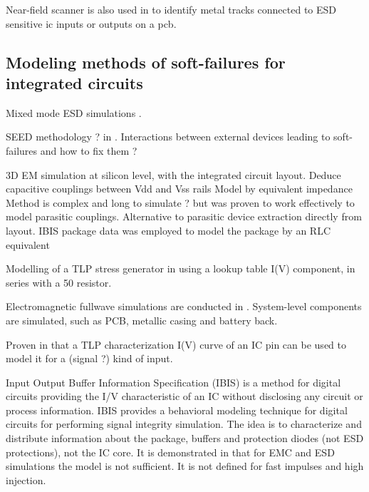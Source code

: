%
Near-field scanner is also used in \cite{NearFieldInjectionBis} to identify metal tracks connected to ESD sensitive \gls{ic} inputs or outputs on a \gls{pcb}.


\subsection{Modeling methods of soft-failures for integrated circuits}

%
Mixed mode ESD simulations \cite{mixedModeESDSims}.

%
SEED methodology ? in \cite{usb2ESDProtection}.
Interactions between external devices leading to soft-failures and how to fix them ?

3D EM simulation \cite{LacrampeTransientImmunity} at silicon level, with the integrated circuit layout.
Deduce capacitive couplings between Vdd and Vss rails
Model by equivalent impedance
Method is complex and long to simulate ? but was proven to work effectively to model parasitic couplings.
Alternative to parasitic device extraction directly from layout.
IBIS package data was employed to model the package by an RLC equivalent

%
Modelling of a TLP stress generator in \cite{LacrampeTransientImmunity} using a lookup table I(V) component, in series with a 50\textOmega{} resistor.

Electromagnetic fullwave simulations are conducted in \cite{softFailMobile}.
System-level components are simulated, such as PCB, metallic casing and battery back.

Proven in \cite{usb2ESDProtection} that a TLP characterization I(V) curve of an IC pin can be used to model it for a (signal ?) kind of input.

Input Output Buffer Information Specification (IBIS) \cite{ibis-spec} is a method for digital circuits providing the I/V characteristic of an IC without disclosing any circuit or process information.
IBIS provides a behavioral modeling technique for digital circuits for performing signal integrity simulation.
The idea is to characterize and distribute information about the package, buffers and protection diodes (not ESD protections), not the IC core.
It is demonstrated in \cite{ibisImprovementFabrice} that for EMC and ESD simulations the model is not sufficient.
It is not defined for fast impulses and high injection.
